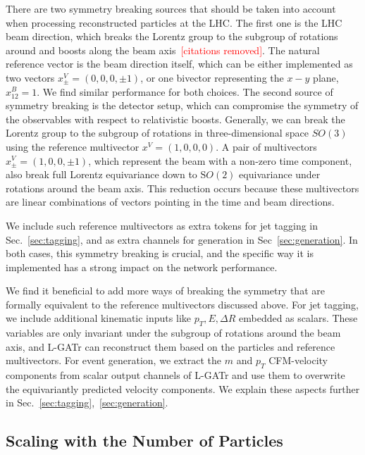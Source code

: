 \documentclass[submission, Phys]{SciPost}
\begin{document}
There are two symmetry breaking sources that should be taken into account when processing reconstructed particles at the LHC. The first one is the LHC beam direction, which breaks the Lorentz group to the subgroup of rotations around and boosts along the beam axis\textcolor{red}{~[citations removed]}. The natural reference vector is the beam direction itself, which can be either implemented as two vectors $x^V_\pm = (0,0,0,\pm 1)$, or one bivector representing the $x-y$ plane, $x^B_{12} = 1$. We find similar performance for both choices. The second source of symmetry breaking is the detector setup, which can compromise the symmetry of the observables with respect to relativistic boosts. Generally, we can break the Lorentz group to the subgroup of rotations in three-dimensional space $SO(3)$ using the reference multivector $x^V = (1,0,0,0)$. A pair of multivectors $x^V_\pm = (1,0,0,\pm 1)$, which represent the beam with a non-zero time component, also break full Lorentz equivariance down to $\mathrm SO(2)$ equivariance under rotations around the beam axis. This reduction occurs because these multivectors are linear combinations of vectors pointing in the time and beam directions.

We include such reference multivectors as extra tokens for jet tagging in Sec.~\ref{sec:tagging}, and as extra channels for generation in Sec~\ref{sec:generation}. In both cases, this symmetry breaking is crucial, and the specific way it is implemented has a strong impact on the network performance.

We find it beneficial to add more ways of breaking the symmetry that are formally equivalent to the reference multivectors discussed above. For jet tagging, we include additional kinematic inputs like $p_T, E, \Delta R$ embedded as scalars. These variables are only invariant under the subgroup of rotations around the beam axis, and L-GATr can reconstruct them based on the particles and reference multivectors. For event generation, we extract the $m$ and $p_T$ CFM-velocity components from scalar output channels of L-GATr and use them to overwrite the equivariantly predicted velocity components. We explain these aspects further in Sec.~\ref{sec:tagging},~\ref{sec:generation}.

\subsection{Scaling with the Number of Particles}
\end{document}
